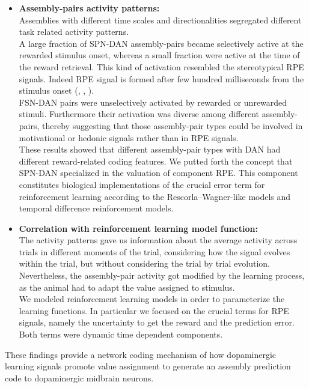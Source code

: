 \begin{itemize}
    \item \textbf{Assembly-pairs activity patterns:}\\
    Assemblies with different time scales and directionalities segregated different task related activity patterns.\\A large fraction of SPN-DAN assembly-pairs became selectively active at the rewarded stimulus onset, whereas a small fraction were active at the time of the reward retrieval. This kind of activation resembled the stereotypical RPE signals. Indeed RPE signal is formed after few hundred milliseconds from the stimulus onset (\cite{Tobler2003}, \cite{Nomoto2010}, \cite{Schultz2016}).\\FSN-DAN pairs were unselectively activated by rewarded or unrewarded stimuli. Furthermore their activation was diverse among different assembly-pairs, thereby suggesting that those assembly-pair types could be involved in motivational or hedonic signals rather than in RPE signals.\\These results showed that different assembly-pair types with DAN had different reward-related coding features. We putted forth the concept that SPN-DAN specialized in the valuation of component RPE. This component constitutes biological implementations of the crucial error term for reinforcement learning according to the Rescorla–Wagner-like models and temporal difference reinforcement models. 
    \item \textbf{Correlation with reinforcement learning model function:}\\The activity patterns gave us information about the average activity across trials in different moments of the trial, considering how the signal evolves within the trial, but without considering the trial by trial evolution. Nevertheless, the assembly-pair activity got modified by the learning process, as the animal had to adapt the value assigned to stimulus.\\We modeled reinforcement learning models in order to parameterize the learning functions. In particular we focused on the crucial terms for RPE signals, namely the uncertainty to get the reward and the prediction error. Both terms were dynamic time dependent components.
\end{itemize}
  These findings provide a network coding mechanism of how dopaminergic learning signals promote value assignment to generate an assembly prediction code to dopaminergic midbrain neurons. 